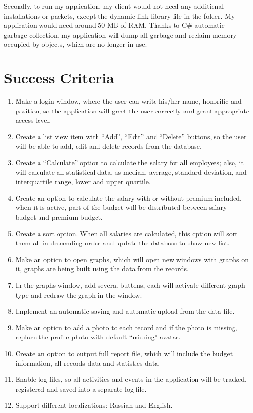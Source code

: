 \documentclass[a4]{article}
\begin{document}
Secondly, to run my application, my client would not need any additional installations or packets, except the dynamic link library file in the folder. My application would need around 50 MB of RAM. Thanks to C\# automatic garbage collection, my application will dump all garbage and reclaim memory occupied by objects, which are no longer in use.\\

\section*{Success Criteria}

\begin{enumerate}
    \item Make a login window, where the user can write his/her name, honorific and position, so the application will greet the user correctly and grant appropriate access level.
    \item Create a list view item with “Add”, “Edit” and “Delete” buttons, so the user will be able to add, edit and delete records from the database.
    \item Create a “Calculate” option to calculate the salary for all employees; also, it will calculate all statistical data, as median, average, standard deviation, and interquartile range, lower and upper quartile.
    \item Create an option to calculate the salary with or without premium included, when it is active, part of the budget will be distributed between salary budget and premium budget.
    \item Create a sort option. When all salaries are calculated, this option will sort them all in descending order and update the database to show new list.
    \item	Make an option to open graphs, which will open new windows with graphs on it, graphs are being built using the data from the records.
    \item	In the graphs window, add several buttons, each will activate different graph type and redraw the graph in the window.
    \item	Implement an automatic saving and automatic upload from the data file.
    \item	Make an option to add a photo to each record and if the photo is missing, replace the profile photo with default “missing” avatar.
    \item	Create an option to output full report file, which will include the budget information, all records data and statistics data.
    \item   Enable log files, so all activities and events in the application will be tracked, registered and saved into a separate log file.
    \item	Support different localizations: Russian and English.
\end{enumerate}
\end{document}
